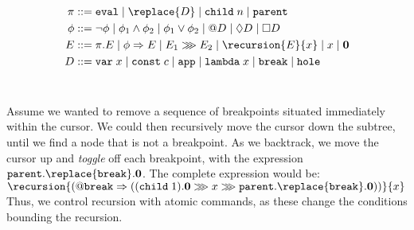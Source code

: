 \begin{align*}
  \pi ::= \; & \texttt{eval} \mid \replace{D} \mid \texttt{child}\; n \mid \texttt{parent}\\
  \phi ::= \; & \neg \phi \mid \phi_1 \land \phi_2 \mid \phi_1 \lor \phi_2 \mid @D \mid \lozenge D \mid \Box D\\
  E ::= \; & \pi.E \mid \phi \Rightarrow E \mid E_1 \ggg E_2 \mid \recursion{E}{x} \mid x \mid \mathbf{0}\\
  D ::= \; & \texttt{var}\;x \mid \texttt{const}\;c \mid \texttt{app} \mid \texttt{lambda}\; x \mid \texttt{break} \mid \texttt{hole}
\end{align*}
\\
\begin{exmp}
Assume we wanted to remove a sequence of breakpoints situated immediately within the cursor. We could then recursively move the cursor down the subtree, until we find a node that is not a breakpoint. As we backtrack, we move the cursor up and \textit{toggle} off each breakpoint, with the expression $\texttt{parent}.\replace{\texttt{break}}.\mathbf{0}$. The complete expression would be:\\

$\recursion{(@\texttt{break} \Rightarrow ((\texttt{child}\; 1).\mathbf{0} \ggg x \ggg \texttt{parent}.\replace{\texttt{break}}.\mathbf{0}))}{x}$\\

Thus, we control recursion with atomic commands, as these change the conditions bounding the recursion.\label{ex:rembreakpoint}
\end{exmp}





